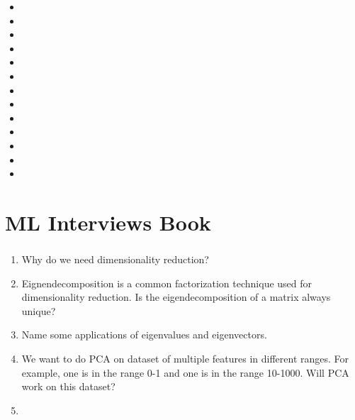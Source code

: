 \documentclass[a4paper]{article}
\newcommand{\cmark}{\ding{51}}%
\newcommand{\done}{\rlap{$\square$}{\raisebox{2pt}{\large\hspace{1pt}\cmark}}\hspace{-2.5pt}}
\begin{document}
\begin{itemize}
    \item [\done] 
    \item [\done] 
    \item [\done] 
    \item [\done] 
    \item [\done] 
    \item [\done] 
    \item [\done] 
    \item [\done] 
    \item [\done] 
    \item [\done] 
    \item [\done] 
    \item [\done] 
    \item [\done] 
    
\end{itemize}
\subsubsection{}


\section{ML Interviews Book}
\subsubsection{}
\begin{enumerate}
    \item Why do we need dimensionality reduction?

    \item Eignendecomposition is a common factorization technique used for dimensionality reduction. Is the eigendecomposition of a matrix always unique?

    \item Name some applications of eigenvalues and eigenvectors.
    
    \item We want to do PCA on  dataset of multiple features in different ranges. For example, one is in the range 0-1 and one is in the range 10-1000. Will PCA work on this dataset?
    
    \item 


\end{enumerate}

\end{document}
